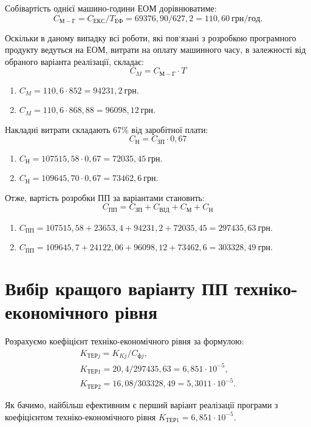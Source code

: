\documentclass[../diploma]{subfiles}
\begin{document}
Собівартість однієї машино-години ЕОМ дорівнюватиме:
$$
C_{М-Г} = C_{ЕКС}/T_{ЕФ} = 69376,90 / 627,2 = 110,60~грн/год.
$$

Оскільки в даному випадку всі роботи, які пов‘язані з розробкою програмного продукту ведуться на ЕОМ, витрати на оплату машинного часу, в залежності від обраного варіанта реалізації, складає:
$$
C_M = C_{М-Г}\cdot T
$$

\begin{enumerate}[label=\Roman*.]
\item $C_M = 110,6\cdot 852 = 94231,2~грн.$
\item $C_M = 110,6\cdot 868,88 = 96098,12~грн.$
\end{enumerate}

Накладні витрати складають 67\% від заробітної плати:
$$
C_Н = C_{ЗП}\cdot 0,67
$$

\begin{enumerate}[label=\Roman*.]
\item $C_Н = 107515,58\cdot 0,67 = 72035,45~грн.$
\item $C_Н = 109645,70\cdot 0,67 = 73462,6~грн.$
\end{enumerate}

Отже, вартість розробки ПП за варіантами становить:
$$
C_{ПП} = C_{ЗП} + C_{ВІД} + C_М + C_Н
$$

\begin{enumerate}[label=\Roman*.]
\item $C_{ПП} = 107515,58 + 23653,4 + 94231,2 + 72035,45 = 297435,63~грн.$
\item $C_{ПП} = 109645,7  + 24122,06 + 96098,12 + 73462,6 = 303328,49~грн.$
\end{enumerate}

\section{Вибір кращого варіанту ПП техніко-економічного рівня}

Розрахуємо коефіцієнт техніко-економічного рівня за формулою:
\begin{gather*}
K_{ТЕРj} = K_{Kj} / C_{фj}, \\
K_{ТЕР1} = 20,4 / 297435,63 = 6,851\cdot 10^{-5}, \\
K_{ТЕР2} = 16,08 / 303328,49 = 5,3011\cdot 10^{-5}.
\end{gather*}

Як бачимо, найбільш ефективним є перший варіант реалізації програми з коефіцієнтом техніко-економічного рівня $K_{ТЕР1} = 6,851\cdot 10^{-5}$.
\end{document}
